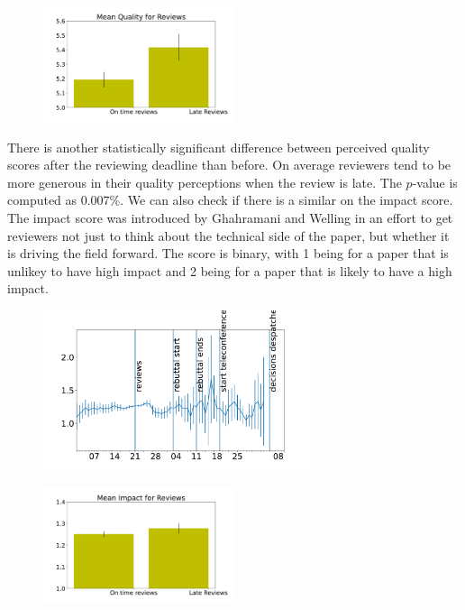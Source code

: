 \begin{figure}[htb]
\includegraphics[width=0.50\textwidth]{diagrams/neurips/review-quality-early-late.pdf}


\caption{}
\label{review-quality-early-late}
\end{figure}

There is another statistically significant difference between perceived
quality scores after the reviewing deadline than before. On average
reviewers tend to be more generous in their quality perceptions when the
review is late. The \(p\)-value is computed as 0.007\%. We can also
check if there is a similar on the impact score. The impact score was
introduced by Ghahramani and Welling in an effort to get reviewers not
just to think about the technical side of the paper, but whether it is
driving the field forward. The score is binary, with 1 being for a paper
that is unlikey to have high impact and 2 being for a paper that is
likely to have a high impact.

\begin{figure}[htb]
\includegraphics[width=0.70\textwidth]{diagrams/neurips/review-impact-time.pdf}


\caption{}
\label{review-impact-time}
\end{figure}

\begin{figure}[htb]
\includegraphics[width=0.50\textwidth]{diagrams/neurips/review-impact-early-late.pdf}


\caption{}
\label{review-impact-early-late}
\end{figure}

